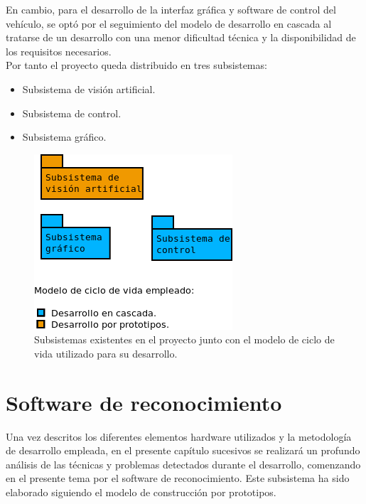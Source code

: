\documentclass[a4paper,12pt]{article}
\begin{document}
En cambio, para el desarrollo de la interfaz gráfica y software de control del vehículo, se optó por el seguimiento del modelo de desarrollo en cascada al tratarse de un desarrollo con una menor dificultad técnica y la disponibilidad de los requisitos necesarios.\\

Por tanto el proyecto queda distribuido en tres subsistemas:

\begin{itemize}
\item Subsistema de visión artificial.
\item Subsistema de control.
\item Subsistema gráfico.
\end{itemize}


\begin{figure}[H]
  \begin{center}
    \includegraphics[scale=0.7]{imagenes/subsistemas.png}
  \end{center}
  \caption{Subsistemas existentes en el proyecto junto con el modelo de ciclo de vida utilizado para su desarrollo.}
  \label{subsistemas}
\end{figure}


\section{Software de reconocimiento}

Una vez descritos los diferentes elementos hardware utilizados y la metodología de desarrollo empleada, en el presente capítulo  sucesivos se realizará un profundo análisis de las técnicas y problemas detectados durante el desarrollo, comenzando en el presente tema por el software de reconocimiento. Este subsistema ha sido elaborado siguiendo el modelo de construcción por prototipos.\\
\end{document}
